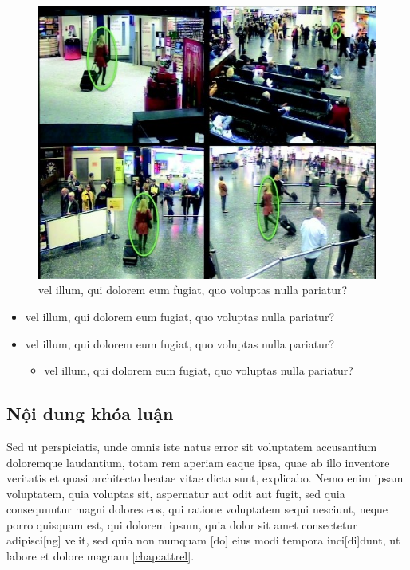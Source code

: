 \begin{figure}
  \includegraphics[width=\linewidth]{Chapter1/Figure/2.jpg}
  \caption{vel illum, qui dolorem eum fugiat, quo voluptas nulla pariatur?}
  \label{fig:12}
\end{figure}

\begin{itemize}
	\item vel illum, qui dolorem eum fugiat, quo voluptas nulla pariatur?
	\item vel illum, qui dolorem eum fugiat, quo voluptas nulla pariatur?
	\begin{itemize}
		\item vel illum, qui dolorem eum fugiat, quo voluptas nulla pariatur?
	\end{itemize}
\end{itemize}


\subsection{Nội dung khóa luận}

Sed ut perspiciatis, unde omnis iste natus error sit voluptatem accusantium doloremque laudantium, totam rem aperiam eaque ipsa, quae ab illo inventore veritatis et quasi architecto beatae vitae dicta sunt, explicabo. Nemo enim ipsam voluptatem, quia voluptas sit, aspernatur aut odit aut fugit, sed quia consequuntur magni dolores eos, qui ratione voluptatem sequi nesciunt, neque porro quisquam est, qui dolorem ipsum, quia dolor sit amet consectetur adipisci[ng] velit, sed quia non numquam [do] eius modi tempora inci[di]dunt, ut labore et dolore magnam \autoref{chap:attrel}. \cite{knuthwebsite}\cite{latexcompanion} \cite{knuthwebsite,latexcompanion}

